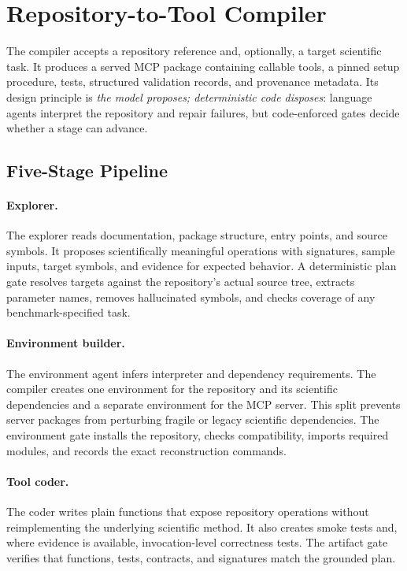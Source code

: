 \documentclass[letterpaper]{article} %
\begin{document}

\section{Repository-to-Tool Compiler}
\label{sec:compiler}

The compiler accepts a repository reference and, optionally, a target scientific task. It produces a served MCP package containing callable tools, a pinned setup procedure, tests, structured validation records, and provenance metadata. Its design principle is \emph{the model proposes; deterministic code disposes}: language agents interpret the repository and repair failures, but code-enforced gates decide whether a stage can advance.

\subsection{Five-Stage Pipeline}

\paragraph{Explorer.}
The explorer reads documentation, package structure, entry points, and source symbols. It proposes scientifically meaningful operations with signatures, sample inputs, target symbols, and evidence for expected behavior. A deterministic plan gate resolves targets against the repository's actual source tree, extracts parameter names, removes hallucinated symbols, and checks coverage of any benchmark-specified task.

\paragraph{Environment builder.}
The environment agent infers interpreter and dependency requirements. The compiler creates one environment for the repository and its scientific dependencies and a separate environment for the MCP server. This split prevents server packages from perturbing fragile or legacy scientific dependencies. The environment gate installs the repository, checks compatibility, imports required modules, and records the exact reconstruction commands.

\paragraph{Tool coder.}
The coder writes plain functions that expose repository operations without reimplementing the underlying scientific method. It also creates smoke tests and, where evidence is available, invocation-level correctness tests. The artifact gate verifies that functions, tests, contracts, and signatures match the grounded plan.
\end{document}
